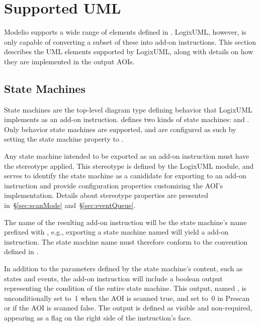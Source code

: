 \section{Supported UML}

Modelio supports a wide range of elements defined in \textcite{OMGUML}.
LogixUML, however, is only capable of converting a subset of these into
add-on instructions. This section describes the UML elements supported
by LogixUML, along with details on how they are implemented in the output
AOIs.

\subsection{State Machines}

State machines are the top-level diagram type defining behavior
that LogixUML implements as an add-on instruction. \textcite[\S14]{OMGUML}
defines two kinds of state machines: 
and . Only behavior state machines are
supported, and are configured as such by setting the state machine
 property to .

Any state machine intended to be exported as an add-on instruction
must have the  stereotype applied.
This stereotype is defined by the LogixUML module, and serves to
identify the state machine as a canididate for exporting to an add-on
instruction and provide configuration properties customizing the
AOI's implementation. Details about stereotype properties are presented
in~\S\ref{sec:scanMode} and~\S\ref{sec:eventQueue}.

The name of the resulting add-on instruction will be the state machine's
name prefixed with , e.g., exporting a state
machine named  will yield a
 add-on instruction.
The state machine name must therefore conform to the convention defined
in \textcite[Chapter~2]{AOI}.

In addition to the parameters defined by the state machine's content,
such as states and events, the add-on instruction will include a
boolean output representing the condition of the entire state machine.
This output, named , is unconditionally set to~1 when
the AOI is scanned true, and set to~0 in Prescan or if the AOI
is scanned false. The  output is defined as visible
and non-required, appearing as a flag on the right side of the
instruction's face.

